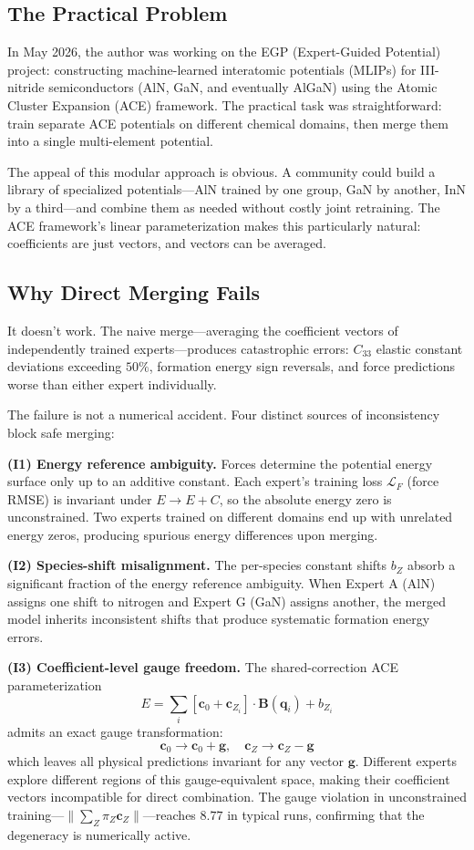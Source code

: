 \documentclass[12pt,a4paper]{ctexart}
\begin{document}
\subsection{The Practical Problem}

In May 2026, the author was working on the EGP (Expert-Guided Potential) project: constructing machine-learned interatomic potentials (MLIPs) for III-nitride semiconductors (AlN, GaN, and eventually AlGaN) using the Atomic Cluster Expansion (ACE) framework. The practical task was straightforward: train separate ACE potentials on different chemical domains, then merge them into a single multi-element potential.

The appeal of this modular approach is obvious. A community could build a library of specialized potentials—AlN trained by one group, GaN by another, InN by a third—and combine them as needed without costly joint retraining. The ACE framework's linear parameterization makes this particularly natural: coefficients are just vectors, and vectors can be averaged.

\subsection{Why Direct Merging Fails}

It doesn't work. The naive merge—averaging the coefficient vectors of independently trained experts—produces catastrophic errors: $C_{33}$ elastic constant deviations exceeding $50\%$, formation energy sign reversals, and force predictions worse than either expert individually.

The failure is not a numerical accident. Four distinct sources of inconsistency block safe merging:

\textbf{(I1) Energy reference ambiguity.} Forces determine the potential energy surface only up to an additive constant. Each expert's training loss $\mathcal{L}_F$ (force RMSE) is invariant under $E \to E + C$, so the absolute energy zero is unconstrained. Two experts trained on different domains end up with unrelated energy zeros, producing spurious energy differences upon merging.

\textbf{(I2) Species-shift misalignment.} The per-species constant shifts $b_Z$ absorb a significant fraction of the energy reference ambiguity. When Expert A (AlN) assigns one shift to nitrogen and Expert G (GaN) assigns another, the merged model inherits inconsistent shifts that produce systematic formation energy errors.

\textbf{(I3) Coefficient-level gauge freedom.} The shared-correction ACE parameterization
\[
E = \sum_i [\mathbf{c}_0 + \mathbf{c}_{Z_i}] \cdot \mathbf{B}(\mathbf{q}_i) + b_{Z_i}
\]
admits an exact gauge transformation:
\[
\mathbf{c}_0 \to \mathbf{c}_0 + \mathbf{g}, \quad \mathbf{c}_Z \to \mathbf{c}_Z - \mathbf{g}
\]
which leaves all physical predictions invariant for any vector $\mathbf{g}$. Different experts explore different regions of this gauge-equivalent space, making their coefficient vectors incompatible for direct combination. The gauge violation in unconstrained training—$\lVert\sum_Z \pi_Z \mathbf{c}_Z\rVert$—reaches $8.77$ in typical runs, confirming that the degeneracy is numerically active.
\end{document}
